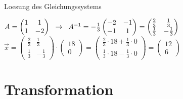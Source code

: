 \documentclass[10pt,aspectratio=169]{beamer}
\begin{document}
\begin{frame}{Loesung des Gleichungssystems}
\begin{itemize}
        $A= \begin{pmatrix}
          1 & 1\\
          1 & -2\\
        \end{pmatrix}\hspace{0.2cm} \rightarrow \hspace{0.2cm}
        A^{-1} = -\frac{1}{3}
        \begin{pmatrix}
          -2 & -1\\
          -1 & 1
        \end{pmatrix}
        = \begin{pmatrix}
          \frac{2}{3} & \frac{1}{3}\\
          \frac{1}{3} & -\frac{1}{3}
        \end{pmatrix}
        $\\\vspace{0.25cm}
        $
        \vec{x} = 
        \begin{pmatrix}
          \frac{2}{3} & \frac{1}{3}\\
          \frac{1}{3} & -\frac{1}{3}
        \end{pmatrix}
        \cdot
        \begin{pmatrix}
          18\\
          0
        \end{pmatrix}
        =
        \begin{pmatrix}
          \frac{2}{3}\cdot18 + \frac{1}{3} \cdot 0\\
          \frac{1}{3}\cdot18 - \frac{1}{3} \cdot 0
        \end{pmatrix}
        =
        \begin{pmatrix}
          12\\
          6
        \end{pmatrix}
        $
      
    \end{itemize}
  \end{frame}



  \section{Transformation}
\end{document}
